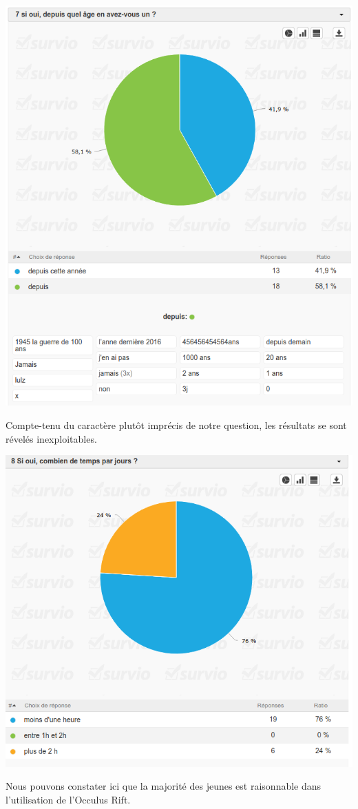 \documentclass[12pt, a4paper]{report}
\begin{document}
\begin{center}
\includegraphics[scale=0.4]{7.png}

Compte-tenu du caractère plutôt imprécis de notre question, les résultats se sont révelés inexploitables.
\end{center}

\begin{center}
\includegraphics[scale=0.5]{8.png}

Nous pouvons constater ici que la majorité des jeunes est raisonnable dans l'utilisation de l'Occulus Rift.
\end{center}
\end{document}

